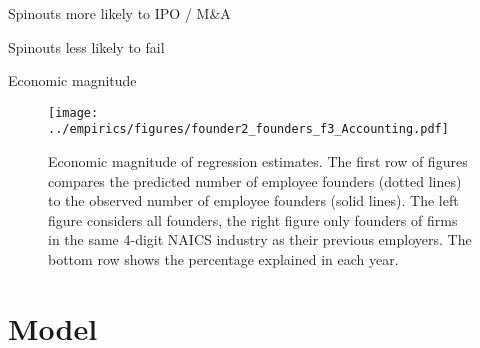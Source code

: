 \documentclass[english,usenames,dvipsnames]{beamer}
\begin{document}
\begin{frame}{Spinouts more likely to IPO / M\&A}
\begin{table}
\tiny
\centering

\caption{\footnotesize The regresssions above compare the \textbf{\alert{M\&A and IPO hazard rate}} in WSO4 spinouts, non-WSO4 spinouts and non-spinouts. The first regression uses no controls. The following three regressions in addition control for year effects, age effects, and / or cohort effects, in each case allowing the relevant effect to differ by State-NAICS4 combination. Standard errors are multi-way clustered at the state, NAICS4 and year levels.}
\end{table}
\end{frame}

\begin{frame}{Spinouts less likely to fail}
\begin{table}
\tiny
\centering

\caption{\footnotesize The regresssions above compare the \textbf{\alert{failure rate}} in WSO4 spinouts, non-WSO4 spinouts and non-spinouts. The first regression uses no controls. The following three regressions in addition control for year effects, age effects, and / or cohort effects, in each case allowing the relevant effect to differ by State-NAICS4 combination. Standard errors are multi-way clustered at the state, NAICS4 and year levels.}
\end{table}
\end{frame}

\begin{frame}{Economic magnitude}
\begin{figure}[!htb]
	\texttt{[image: ../empirics/figures/founder2\_founders\_f3\_Accounting.pdf]}
	\caption{\tiny Economic magnitude of regression estimates. The first row of figures compares the predicted number of employee founders (dotted lines) to the observed number of employee founders (solid lines). The left figure considers all founders, the right figure only founders of firms in the same 4-digit NAICS industry as their previous employers. The bottom row shows the percentage explained in each year.}
\end{figure}
\end{frame}

\section{Model}
\end{document}
